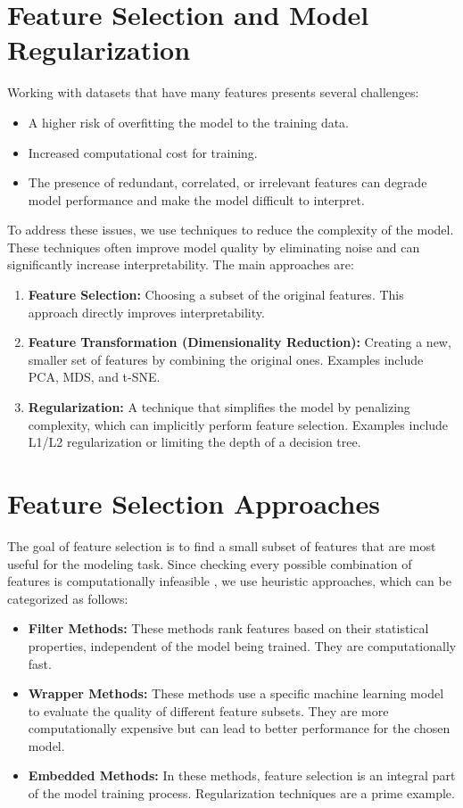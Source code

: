 \documentclass{article}
\begin{document}
\begin{multicols}{2}
\section{Feature Selection and Model Regularization}
Working with datasets that have many features presents several challenges:
\begin{itemize}
    \item A higher risk of overfitting the model to the training data.
    \item Increased computational cost for training.
    \item The presence of redundant, correlated, or irrelevant features can degrade model performance and make the model difficult to interpret.
\end{itemize}

To address these issues, we use techniques to reduce the complexity of the model. These techniques often improve model quality by eliminating noise and can significantly increase interpretability. The main approaches are:
\begin{enumerate}
    \item \textbf{Feature Selection:} Choosing a subset of the original features. This approach directly improves interpretability.
    \item \textbf{Feature Transformation (Dimensionality Reduction):} Creating a new, smaller set of features by combining the original ones. Examples include PCA, MDS, and t-SNE.
    \item \textbf{Regularization:} A technique that simplifies the model by penalizing complexity, which can implicitly perform feature selection. Examples include L1/L2 regularization or limiting the depth of a decision tree.
\end{enumerate}

\section{Feature Selection Approaches}
The goal of feature selection is to find a small subset of features that are most useful for the modeling task. Since checking every possible combination of features is computationally infeasible , we use heuristic approaches, which can be categorized as follows:
\begin{itemize}
    \item \textbf{Filter Methods:} These methods rank features based on their statistical properties, independent of the model being trained. They are computationally fast.
    \item \textbf{Wrapper Methods:} These methods use a specific machine learning model to evaluate the quality of different feature subsets. They are more computationally expensive but can lead to better performance for the chosen model.
    \item \textbf{Embedded Methods:} In these methods, feature selection is an integral part of the model training process. Regularization techniques are a prime example.
\end{itemize}


\end{multicols}
\end{document}
